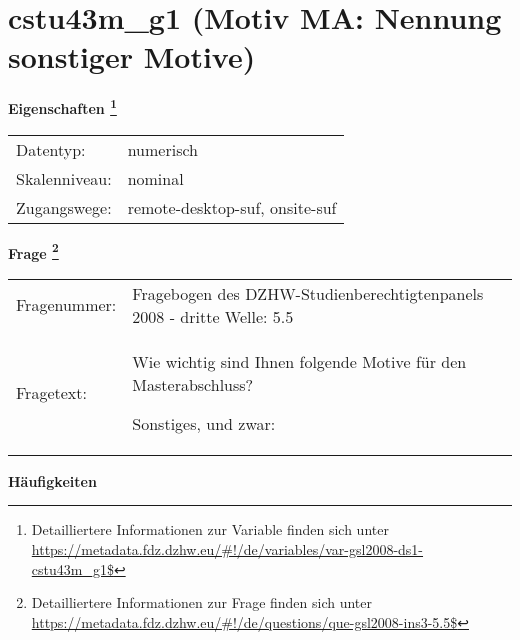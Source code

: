 
    \setcounter{footnote}{0}

    \vspace*{-1.8cm}
	\section{cstu43m\_g1 (Motiv MA: Nennung sonstiger Motive)}
	\label{section:cstu43m_g1}



    \vspace*{0.5cm}
    \noindent\textbf{Eigenschaften
	\footnote{Detailliertere Informationen zur Variable finden sich unter
		\url{https://metadata.fdz.dzhw.eu/\#!/de/variables/var-gsl2008-ds1-cstu43m_g1$}}}\\
	\begin{tabularx}{\hsize}{@{}lX}
	Datentyp: & numerisch \\
	Skalenniveau: & nominal \\
	Zugangswege: &
	  remote-desktop-suf, 
	  onsite-suf
 \\
    \end{tabularx}



				\vspace*{0.5cm}
                \noindent\textbf{Frage
	                \footnote{Detailliertere Informationen zur Frage finden sich unter
		              \url{https://metadata.fdz.dzhw.eu/\#!/de/questions/que-gsl2008-ins3-5.5$}}}\\
				\begin{tabularx}{\hsize}{@{}lX}
					Fragenummer: &
					  Fragebogen des DZHW-Studienberechtigtenpanels 2008 - dritte Welle:
					  5.5
 \\
					Fragetext: & Wie wichtig sind Ihnen folgende Motive für den Masterabschluss?\par  Sonstiges, und zwar: \\
				\end{tabularx}





        		\vspace*{0.5cm}
                \noindent\textbf{Häufigkeiten}

